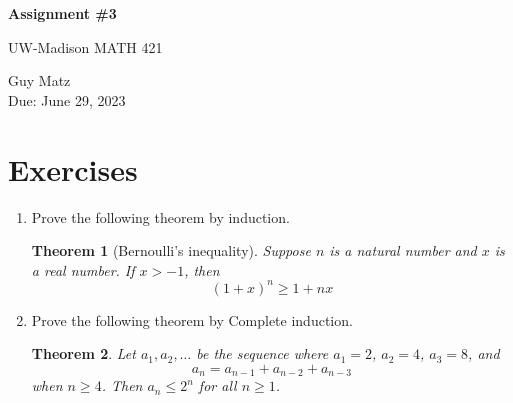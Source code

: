 \documentclass{article} %
\theoremstyle{plain}
\newtheorem*{theorem*}{Theorem}
\theoremstyle{definition}
\theoremstyle{case}
\begin{document}
\begin{center}
\Large{\textbf{Assignment \#3}
            
UW-Madison MATH 421} %
\vspace{5pt}
        
\normalsize{  Guy Matz%
        \\ Due: June 29, 2023}
\vspace{15pt}
\end{center}

\section*{Exercises}%
\begin{enumerate}[label={\fbox{\textbf{Exercise \#\arabic* :}}}]
\item Prove the following theorem by induction.  

\begin{theorem*}[Bernoulli's inequality] Suppose $n$ is a natural
  number and $x$ is a real number. If $x > -1$, then 
  \[ (1+x)^n \geq 1 + nx \]

\end{theorem*} 

  

\newpage
\item Prove the following theorem by Complete induction.  

 \begin{theorem*} Let $a_1,a_2,\dots$ be the sequence where $a_1=2$, $a_2=4$, $a_3=8$, and 
 $$a_n = a_{n-1}+a_{n-2}+a_{n-3}$$ 
 when $n \geq 4$. Then $a_n \leq 2^n$ for all $n \geq 1$. 
 

\end{theorem*}
\end{enumerate}
\end{document}
